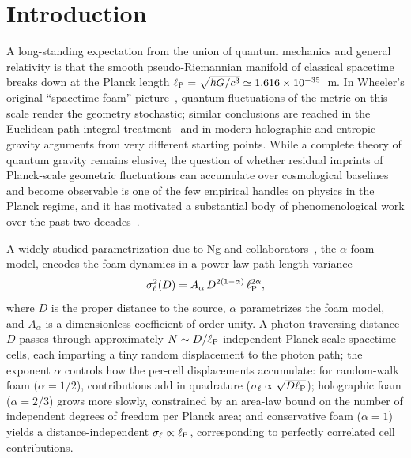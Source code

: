 \documentclass[aps,prd,onecolumn,amsmath,amssymb]{revtex4-2}
\begin{document}
\section{Introduction}
\label{sec:intro}

A long-standing expectation from the union of quantum mechanics and general
relativity is that the smooth pseudo-Riemannian manifold of classical spacetime
breaks down at the Planck length
$\ell_{\rm P} = \sqrt{\hbar G/c^3} \simeq 1.616\times 10^{-35}$~m.
In Wheeler's original ``spacetime foam'' picture~\cite{Wheeler1955}, quantum
fluctuations of the metric on this scale render the geometry stochastic;
similar conclusions are reached in the Euclidean path-integral
treatment~\cite{Hawking1978} and in modern holographic and entropic-gravity
arguments from very different starting points.
While a complete theory of quantum gravity remains elusive, the question of
whether residual imprints of Planck-scale geometric fluctuations can accumulate
over cosmological baselines and become observable is one of the few empirical
handles on physics in the Planck regime, and it has motivated a substantial
body of phenomenological work over the past two
decades~\cite{Carlip2023,NgPerlman2022}.

A widely studied parametrization due to Ng and
collaborators~\cite{Ng2001,Ng2003,NgPerlman2022}, the $\alpha$-foam model,
encodes the foam dynamics in a power-law path-length variance
\begin{equation}
  \sigma_\ell^2(D) = A_\alpha\,D^{2(1-\alpha)}\,\ell_{\rm P}^{2\alpha},
  \label{eq:NgPerlmanVar}
\end{equation}
where $D$ is the proper distance to the source, $\alpha$ parametrizes the foam
model, and $A_\alpha$ is a dimensionless coefficient of order unity.
A photon traversing distance $D$ passes through approximately
$N \sim D/\ell_{\rm P}$ independent Planck-scale spacetime cells, each imparting
a tiny random displacement to the photon path; the exponent $\alpha$ controls
how the per-cell displacements accumulate: for random-walk foam ($\alpha=1/2$),
contributions add in quadrature ($\sigma_\ell \propto \sqrt{D\ell_{\rm P}}$);
holographic foam ($\alpha=2/3$) grows more slowly, constrained by an area-law
bound on the number of independent degrees of freedom per Planck area; and
conservative foam ($\alpha=1$) yields a distance-independent
$\sigma_\ell \propto \ell_{\rm P}$, corresponding to perfectly correlated cell
contributions.
\end{document}
